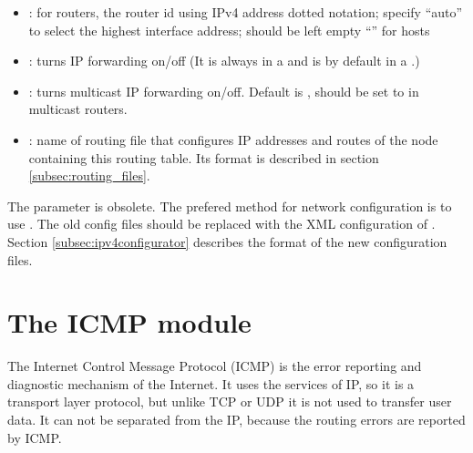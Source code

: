 \begin{itemize}
  \item {}: for routers, the router id using IPv4 address dotted notation;
        specify ``auto'' to select the highest interface address; should be left empty ``''
        for hosts
  \item {}: turns IP forwarding on/off (It is always 
                          in a  and is  by default
                          in a .)
  \item {}: turns multicast IP forwarding on/off. Default is ,
  should be set to  in multicast routers.
  \item {}: name of routing file that configures IP addresses and routes of the node
  containing this routing table. Its format is described in section \ref{subsec:routing_files}.
\end{itemize}

\begin{warning}
The  parameter is obsolete. The prefered method for network configuration
is to use . The old config files should be replaced
with the XML configuration of . Section \ref{subsec:ipv4configurator}
describes the format of the new configuration files.
\end{warning}


\section{The ICMP module}

The Internet Control Message Protocol (ICMP) is the error reporting and
diagnostic mechanism of the Internet.
It uses the services of IP, so it is a transport layer protocol, but unlike
TCP or UDP it is not used to transfer user data. It can not be separated
from the IP, because the routing errors are reported by ICMP.

